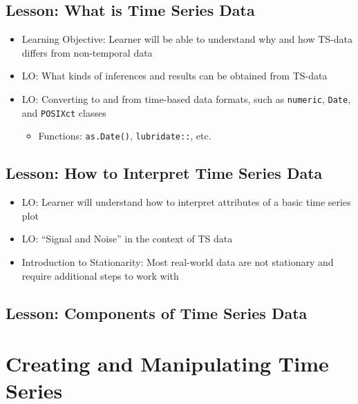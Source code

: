 \documentclass[
]{book}
\providecommand{\tightlist}{%
  \setlength{\itemsep}{0pt}\setlength{\parskip}{0pt}}
\begin{document}
\hypertarget{lesson-what-is-time-series-data}{%
\section{Lesson: What is Time Series Data}\label{lesson-what-is-time-series-data}}

\begin{itemize}
\tightlist
\item
  Learning Objective: Learner will be able to understand why and how TS-data differs from non-temporal data
\item
  LO: What kinds of inferences and results can be obtained from TS-data
\item
  LO: Converting to and from time-based data formats, such as \texttt{numeric}, \texttt{Date}, and \texttt{POSIXct} classes

  \begin{itemize}
  \tightlist
  \item
    Functions: \texttt{as.Date()}, \texttt{lubridate::}, etc.
  \end{itemize}
\end{itemize}

\hypertarget{lesson-how-to-interpret-time-series-data}{%
\section{Lesson: How to Interpret Time Series Data}\label{lesson-how-to-interpret-time-series-data}}

\begin{itemize}
\tightlist
\item
  LO: Learner will understand how to interpret attributes of a basic time series plot
\item
  LO: ``Signal and Noise'' in the context of TS data
\item
  Introduction to Stationarity: Most real-world data are not stationary and require additional steps to work with
\end{itemize}

\hypertarget{lesson-components-of-time-series-data}{%
\section{Lesson: Components of Time Series Data}\label{lesson-components-of-time-series-data}}

\hypertarget{creating-and-manipulating-time-series}{%
\chapter{Creating and Manipulating Time Series}\label{creating-and-manipulating-time-series}}
\end{document}
